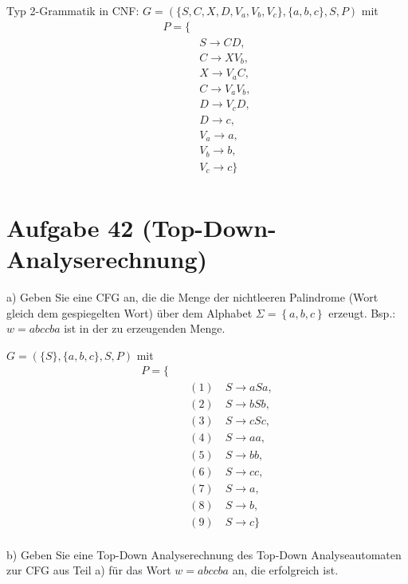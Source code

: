 \documentclass{article}
\begin{document}
Typ 2-Grammatik in CNF:
$G = (\{S, C, X, D, V_a, V_b, V_c\}, \{a, b, c\}, S, P)$ mit
\begin{equation}
\begin{split}
P = \{ \\\
&S \rightarrow CD, \\
&C \rightarrow XV_b, \\\
&X \rightarrow V_aC, \\\
&C \rightarrow V_aV_b, \\\
&D \rightarrow V_cD, \\\
&D \rightarrow c, \\\
&V_a \rightarrow a, \\\
&V_b \rightarrow b, \\\
&V_c \rightarrow c \} \\\
\end{split}
\end{equation}


\section*{Aufgabe 42 (Top-Down-Analyserechnung)}

a) Geben Sie eine CFG an, die die Menge der nichtleeren Palindrome (Wort gleich dem gespiegelten Wort) über dem Alphabet $\Sigma = \left\{a, b, c\right\}$ erzeugt. Bsp.: $w=abccba$ ist in der zu erzeugenden Menge.

$G = (\{S\}, \{a, b, c\}, S, P)$ mit
\begin{equation}
\begin{split}
P = \{ \\\
&\quad (1) \quad S \rightarrow aSa, \\\ 
&\quad (2) \quad S \rightarrow bSb, \\\
&\quad (3) \quad S \rightarrow cSc, \\\
&\quad (4) \quad S \rightarrow aa, \\\
&\quad (5) \quad S \rightarrow bb, \\\
&\quad (6) \quad S \rightarrow cc, \\\
&\quad (7) \quad S \rightarrow a, \\\
&\quad (8) \quad S \rightarrow b, \\\
&\quad (9) \quad S \rightarrow c \} \\\
\end{split}
\end{equation}

b) Geben Sie eine Top-Down Analyserechnung des Top-Down Analyseautomaten zur CFG aus Teil a) für das Wort $w=abccba$ an, die erfolgreich ist.
\end{document}
